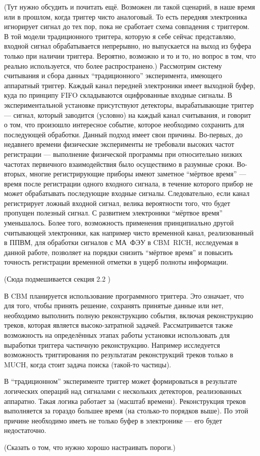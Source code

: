 (Тут нужно обсудить и почитать ещё. Возможен ли такой сценарий, в наше время или в прошлом, когда триггер чисто аналоговый. То есть передняя электроника игнорирует сигнал до тех пор, пока не сработает схема совпадения с триггером. В той модели традиционного триггера, которую я себе сейчас представляю, входной сигнал обрабатывается непрерывно, но выпускается на выход из буфера только при наличии триггера. Вероятно, возможно и то и то, но вопрос в том, что реально используется, что более распространено.)
Рассмотрим систему считывания и сбора данных ``традиционного'' эксперимента, имеющего аппаратный триггер. Каждый канал передней электроники имеет выходной буфер, куда по принципу FIFO складываются оцифрованные входные сигналы. В экспериментальной установке присутствуют детекторы, вырабатывающие триггер --- сигнал, который заводится (условно) на каждый канал считывания, и говорит о том, что произошло интересное событие, которое необходимо сохранить для последующей обработки. Данный подход имеет свои причины. Во-первых, до недавнего времени физические эксперименты не требовали высоких частот регистрации --- выполнение физической программы при относительно низких частотах первичного взаимодействия было осуществимо в разумные сроки. Во-вторых, многие регистрирующие приборы имеют заметное ``мёртвое время'' --- время после регистрации одного входного сигнала, в течение которого прибор не может обрабатывать последующие входные сигналы. Следовательно, если канал регистрирует ложный входной сигнал, велика вероятности того, что будет пропущен полезный сигнал. С развитием электроники ``мёртвое время'' уменьшалось. Более того, возможность применения принципиально другой считывающей электроники, как например чисто временной канал, реализованный в ППВМ, для обработки сигналов с МА~ФЭУ в CBM~RICH, исследуемая в данной работе, позволяет на порядки снизить ``мёртвое время'' и повысить точность регистрации временной отметки в ущерб полноты информации.

(Сюда подмешивается секция 2.2 \todo)

В CBM планируется использование программного триггера. Это означает, что для того, чтобы принять решение, сохранять принятые данные или нет, необходимо выполнить полную реконструкцию события, включая реконструкцию треков, которая является высоко-затратной задачей. Рассматривается также возможность на определённых этапах работы установки использовать для выработки триггера частичную реконструкцию. Например исследуется возможность триггирования по результатам реконструкций треков только в MUCH, когда стоит задача поиска (\todo такой-то частицы).

В ``традиционном'' эксперименте триггер может формироваться в результате логических операций над сигналами с нескольких детекторов, реализованных аппаратно. Такая логика работает за (\todo масштаб времени). Реконструкция треков выполняется за гораздо большее время (\todo на столько-то порядков выше). По этой причине необходимо иметь не только буфер в электронике --- его будет недостаточно. 

(Сказать о том, что нужно хорошо настраивать пороги.)
